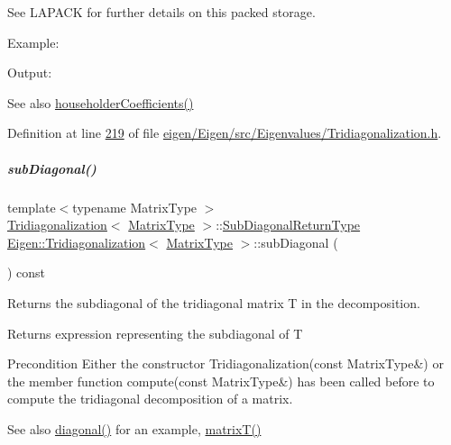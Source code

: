 See L\+A\+P\+A\+CK for further details on this packed storage.

Example\+: 
\begin{DoxyCodeInclude}
\end{DoxyCodeInclude}
 Output\+: 
\begin{DoxyVerbInclude}
\end{DoxyVerbInclude}


\begin{DoxySeeAlso}{See also}
\hyperlink{group___eigenvalues___module_ac95b4e43dcf6c3c5074b8bea4fc67887}{householder\+Coefficients()} 
\end{DoxySeeAlso}


Definition at line \hyperlink{eigen_2_eigen_2src_2_eigenvalues_2_tridiagonalization_8h_source_l00219}{219} of file \hyperlink{eigen_2_eigen_2src_2_eigenvalues_2_tridiagonalization_8h_source}{eigen/\+Eigen/src/\+Eigenvalues/\+Tridiagonalization.\+h}.

\mbox{\label{group___eigenvalues___module_ac423dbb91157c159bdcb4b5a8371232e}} 
\subparagraph{\texorpdfstring{sub\+Diagonal()}{subDiagonal()}\hspace{0.1cm}{\footnotesize\ttfamily [1/2]}}
{\footnotesize\ttfamily template$<$typename Matrix\+Type $>$ \\
\hyperlink{group___eigenvalues___module_class_eigen_1_1_tridiagonalization}{Tridiagonalization}$<$ \hyperlink{group___eigenvalues___module_add0f4b2216d0ea8ee0f7d8525deaf0a9}{Matrix\+Type} $>$\+::\hyperlink{class_eigen_1_1internal_1_1_tensor_lazy_evaluator_writable}{Sub\+Diagonal\+Return\+Type} \hyperlink{group___eigenvalues___module_class_eigen_1_1_tridiagonalization}{Eigen\+::\+Tridiagonalization}$<$ \hyperlink{group___eigenvalues___module_add0f4b2216d0ea8ee0f7d8525deaf0a9}{Matrix\+Type} $>$\+::sub\+Diagonal (\begin{DoxyParamCaption}{ }\end{DoxyParamCaption}) const}



Returns the subdiagonal of the tridiagonal matrix T in the decomposition. 

\begin{DoxyReturn}{Returns}
expression representing the subdiagonal of T
\end{DoxyReturn}
\begin{DoxyPrecond}{Precondition}
Either the constructor Tridiagonalization(const Matrix\+Type\&) or the member function compute(const Matrix\+Type\&) has been called before to compute the tridiagonal decomposition of a matrix.
\end{DoxyPrecond}
\begin{DoxySeeAlso}{See also}
\hyperlink{group___eigenvalues___module_a0b7ff4860aa6f7c0761b1059c012fd8e}{diagonal()} for an example, \hyperlink{group___eigenvalues___module_a6eb5ef94b8b9bb013c0e69b6df56d0df}{matrix\+T()} 
\end{DoxySeeAlso}



